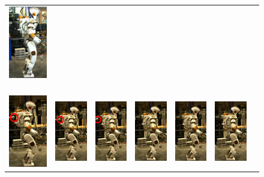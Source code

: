 \begin{figure}[h]
\begin{tabular}{ccccccc}
    \includegraphics[width=0.7in]{STYLESTUFF/val7z_30} ~\\[2ex]
     \includegraphics[width=0.7in]{STYLESTUFF/val1dr_C} &
    \includegraphics[width=0.7in]{STYLESTUFF/val2dr_30} &
    \includegraphics[width=0.7in]{STYLESTUFF/val3dr_30} &
    \includegraphics[width=0.7in]{STYLESTUFF/val4d_30} &
    \includegraphics[width=0.7in]{STYLESTUFF/val5d_30} &
    \includegraphics[width=0.7in]{STYLESTUFF/val6d_30} &

\end{tabular}
\end{figure}

